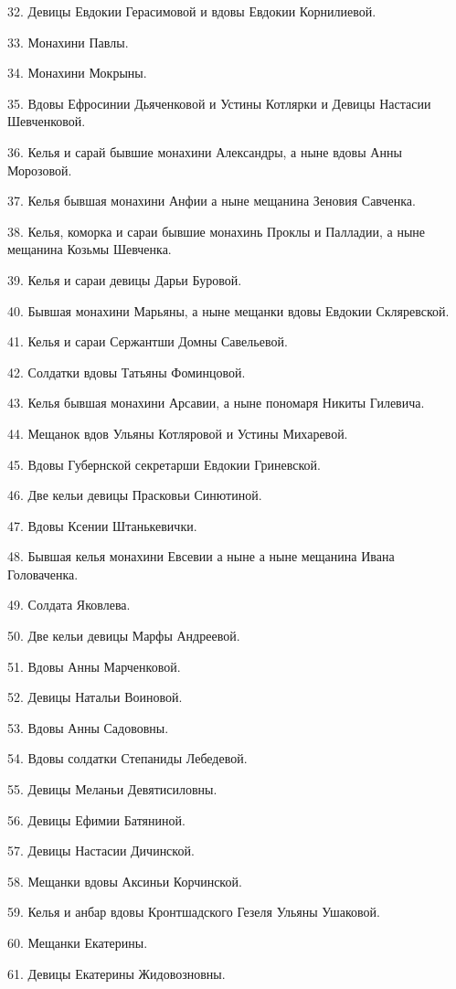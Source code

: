 32. Девицы Евдокии Герасимовой и вдовы Евдокии Корнилиевой.

33. Монахини Павлы.

34. Монахини Мокрыны.

35. Вдовы Ефросинии Дьяченковой и Устины Котлярки и Девицы Настасии Шевченковой.

36. Келья и сарай бывшие монахини Александры, а ныне вдовы Анны Морозовой.

37. Келья бывшая монахини Анфии а ныне мещанина Зеновия Савченка.

38. Келья, коморка и сараи бывшие монахинь Проклы и Палладии, а ныне мещанина Козьмы Шевченка.

39. Келья и сараи девицы Дарьи Буровой.

40. Бывшая монахини Марьяны, а ныне мещанки вдовы Евдокии Скляревской.

41. Келья и сараи Сержантши Домны Савельевой.

42. Солдатки вдовы Татьяны Фоминцовой.

43. Келья бывшая монахини Арсавии, а ныне пономаря Никиты Гилевича.

44. Мещанок вдов Ульяны Котляровой и Устины Михаревой.

45. Вдовы Губернской секретарши Евдокии Гриневской.

46. Две кельи девицы Прасковьи Синютиной.

47. Вдовы Ксении Штанькевички.

48. Бывшая келья монахини Евсевии а ныне а ныне мещанина Ивана Головаченка.

49. Солдата Яковлева.

50. Две кельи девицы Марфы Андреевой.

51. Вдовы Анны Марченковой.

52. Девицы Натальи Воиновой.

53. Вдовы Анны Садововны.

54. Вдовы солдатки Степаниды Лебедевой.

55. Девицы Меланьи Девятисиловны.

56. Девицы Ефимии Батяниной.

57. Девицы Настасии Дичинской.

58. Мещанки вдовы Аксиньи Корчинской.

59. Келья и анбар вдовы Кронтшадского Гезеля Ульяны Ушаковой.

60. Мещанки Екатерины.

61. Девицы Екатерины Жидовозновны.

